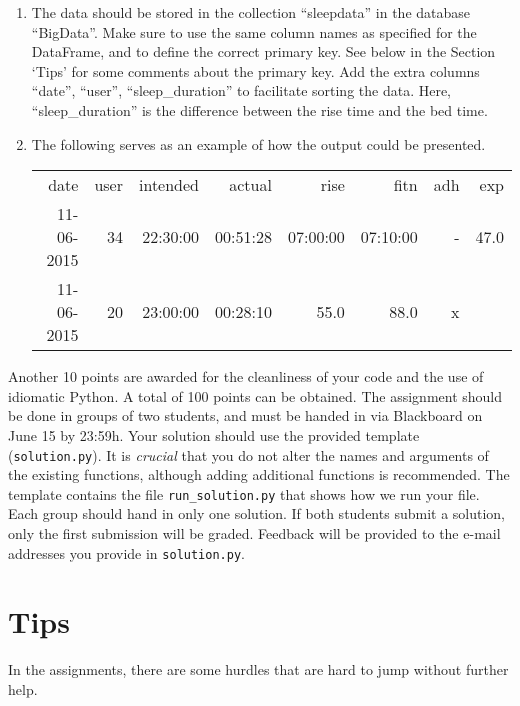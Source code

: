 \documentclass[a4paper]{report}
\theoremstyle{definition}
\begin{document}
\begin{enumerate}

\item The data should be stored in the collection ``sleepdata'' in the
database ``BigData''.  Make sure to use the same column names as specified
for the DataFrame, and to define the correct primary key. See below in the
Section `Tips' for some comments about the primary key. Add the extra
columns ``date'', ``user'', ``sleep\_duration'' to facilitate sorting
the data. Here, ``sleep\_duration'' is the difference between the rise
time and the bed time.

\item The following serves as an example of how the
output could be presented.

\begin{tabular}{|r r r r r r r r|}
\hline
date & user & intended & actual & rise & fitn & adh & exp \\
11-06-2015 & 34 & 22:30:00 & 00:51:28 & 07:00:00 & 07:10:00 & - & 47.0 \\
11-06-2015 & 20 & 23:00:00 & 00:28:10 & 55.0 & 88.0 & x & \\
\hline
\end{tabular}

\end{enumerate}

Another 10 points are awarded for the cleanliness of your code and
the use of idiomatic Python. A total of 100 points can be obtained.
The assignment should be done in groups of two students, and must be
handed in via Blackboard on June 15 by 23:59h. Your solution should use
the provided template (\texttt{\small solution.py}). It is \emph{crucial}
that you do not alter the names and arguments of the existing functions,
although adding additional functions is recommended. The template
contains the file \texttt{\small run\_solution.py} that shows how we
run your file. Each group should hand in only one solution. If both
students submit a solution, only the first submission will be graded.
Feedback will be provided to the e-mail addresses you provide in
\texttt{\small solution.py}.


\section*{Tips}

In the assignments, there are some hurdles that are hard to jump without
further help.
\end{document}
